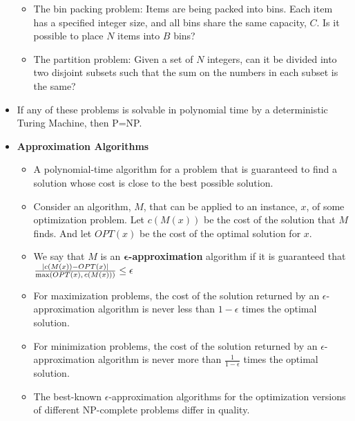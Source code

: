\documentclass{article}
\begin{document}
\begin{itemize}
\begin{itemize}
        \item The bin packing problem: Items are being packed into bins. Each item has a specified integer size, and all bins share the same capacity, \(C\). Is it possible to place \(N\) items into \(B\) bins?
        \item The partition problem: Given a set of \(N\) integers, can it be divided into two disjoint subsets such that the sum on the numbers in each subset is the same?
    \end{itemize}
    \item If any of these problems is solvable in polynomial time by a deterministic Turing Machine, then P=NP.
    \item \textbf{Approximation Algorithms}
    \begin{itemize}
        \item A polynomial-time algorithm for a problem that is guaranteed to find a solution whose cost is close to the best possible solution.
        \item Consider an algorithm, \(M\), that can be applied to an instance, \(x\), of some optimization problem. Let \(c(M(x))\) be the cost of the solution that \(M\) finds. And let \(OPT(x)\) be the cost of the optimal solution for \(x\).
        \item We say that \(M\) is an \(\bm{\epsilon}\)\textbf{-approximation} algorithm if it is guaranteed that \(\frac{|c(M(x))-OPT(x)|}{\textnormal{max}(OPT(x),\,c(M(x)))}\leq \epsilon\)
        \item For maximization problems, the cost of the solution returned by an \(\epsilon\)-approximation algorithm is never less than \(1-\epsilon\) times the optimal solution.
        \item For minimization problems, the cost of the solution returned by an \(\epsilon\)-approximation algorithm is never more than \(\frac{1}{1-\epsilon}\) times the optimal solution.
        \item The best-known \(\epsilon\)-approximation algorithms for the optimization versions of different NP-complete problems differ in quality.
    \end{itemize}
\end{itemize}
\end{document}

